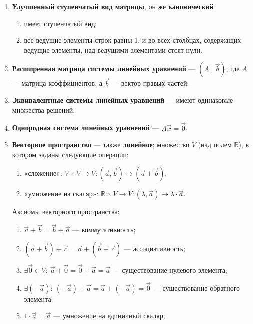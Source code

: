 \documentclass[a4paper, 12pt]{article}
\begin{document}
\begin{enumerate}
\item \textbf{Улучшенный ступенчатый вид матрицы}, он же \textbf{канонический} 
\begin{enumerate}
\item имеет ступенчатый вид;
\item все ведущие элементы строк равны 1, и во всех столбцах, содержащих ведущие элементы, над ведущими элементами стоят нули.
\end{enumerate}

\item \textbf{Расширенная матрица системы линейных уравнений} — $(A \mid \vec b)$, где $A$ — матрица коэффициентов, а $\vec b$ — вектор правых частей.

\item \textbf{Эквивалентные системы линейных уравнений} — имеют одинаковые множества решений.

\item \textbf{Однородная система линейных уравнений} — $A \vec x = \vec 0$.

\item \textbf{Векторное пространство} — также \textbf{линейное}; множество $V$ (над полем $\mathbb{R}$), в котором заданы следующие операции:
\begin{enumerate}
\item «сложение»: $V \times V \rightarrow V: (\vec{a}, \vec{b}) \mapsto (\vec{a}+\vec{b})$;

\item «умножение на скаляр»: $\mathbb{R} \times V \rightarrow V: (\lambda, \vec{a}) \mapsto \lambda \cdot \vec{a}$.
\end{enumerate}
Аксиомы векторного пространства:
\begin{enumerate}
\item $\vec{a}+\vec{b} = \vec{b}+\vec{a}$ --- коммутативность;

\item $(\vec{a}+\vec{b}) + \vec{c} = \vec{a} + (\vec{b} + \vec{c})$ --- ассоциативность;

\item $\exists \vec0 \in V:\ \vec{a} + \vec0 = \vec0 + \vec{a} = \vec{a}$ --- существование нулевого элемента;

\item $\exists (-\vec{a}):\ (-\vec{a}) + \vec{a} = \vec{a} + (-\vec{a}) = \vec{0}$ --- существование обратного элемента;

\item $1 \cdot \vec{a} = \vec{a}$ --- умножение на единичный скаляр;


\end{enumerate}
\end{enumerate}
\end{document}
